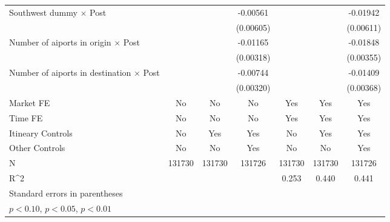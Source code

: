 \begin{table}[htbp]
\begin{tabular}{l*{6}{c}}
\addlinespace
Southwest dummy $\times$ Post&                     &                     &    -0.00561         &                     &                     &    -0.01942\sym{***}\\
                    &                     &                     &   (0.00605)         &                     &                     &   (0.00611)         \\
\addlinespace
Number of aiports in origin $\times$ Post&                     &                     &    -0.01165\sym{***}&                     &                     &    -0.01848\sym{***}\\
                    &                     &                     &   (0.00318)         &                     &                     &   (0.00355)         \\
\addlinespace
Number of aiports in destination $\times$ Post&                     &                     &    -0.00744\sym{**} &                     &                     &    -0.01409\sym{***}\\
                    &                     &                     &   (0.00320)         &                     &                     &   (0.00368)         \\
\midrule
Market FE           &          No         &          No         &          No         &         Yes         &         Yes         &         Yes         \\
Time FE             &          No         &          No         &          No         &         Yes         &         Yes         &         Yes         \\
Itineary Controls   &          No         &         Yes         &         Yes         &          No         &         Yes         &         Yes         \\
Other Controls      &          No         &          No         &         Yes         &          No         &          No         &         Yes         \\
N                   &      131730         &      131730         &      131726         &      131730         &      131730         &      131726         \\
R^2                 &                     &                     &                     &       0.253         &       0.440         &       0.441         \\
\bottomrule
\multicolumn{7}{l}{\footnotesize Standard errors in parentheses}\\
\multicolumn{7}{l}{\footnotesize \sym{*} \(p<0.10\), \sym{**} \(p<0.05\), \sym{***} \(p<0.01\)}\\
\end{tabular}
\end{table}
